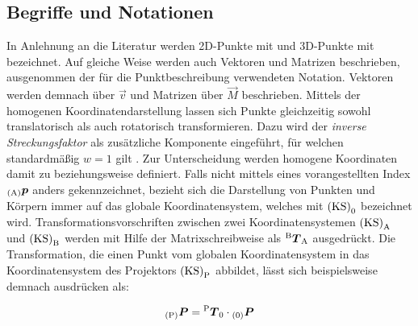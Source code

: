 \subsection{Begriffe und Notationen}
In Anlehnung an die Literatur \cite{Zhang2000} werden 2D-Punkte mit  und 3D-Punkte mit  bezeichnet. Auf gleiche Weise werden auch Vektoren und Matrizen beschrieben, ausgenommen der für die Punktbeschreibung verwendeten Notation. Vektoren werden demnach über $\vec{v}$ und Matrizen über $\vec{M}$ beschrieben. Mittels der homogenen Koordinatendarstellung lassen sich Punkte gleichzeitig sowohl translatorisch als auch rotatorisch transformieren. Dazu wird der \textit{inverse Streckungsfaktor} als zusätzliche Komponente eingeführt, für welchen standardmäßig $w=1$ gilt \cite{Nischwitz20111}. Zur Unterscheidung werden homogene Koordinaten damit zu  beziehungsweise  definiert. Falls nicht mittels eines vorangestellten Index ${_{{\mathrm{(A)}}}}\mbox{\boldmath{$p$}}$ anders gekennzeichnet, bezieht sich die Darstellung von Punkten und Körpern immer auf das globale Koordinatensystem, welches mit ${\mathrm{(KS)}}_{\mathrm{0}}$ bezeichnet wird. Transformationsvorschriften zwischen zwei Koordinatensystemen ${\mathrm{(KS)}}_{\mathrm{A}}$ und ${\mathrm{(KS)}}_{\mathrm{B}}$ werden mit Hilfe der Matrixschreibweise als ${^{\mathrm{B}}\mbox{\boldmath{$T$}}_{\mathrm{A}}}$ ausgedrückt. Die Transformation, die einen Punkt vom globalen Koordinatensystem in das Koordinatensystem des Projektors ${\mathrm{(KS)}}_{\mathrm{P}}$ abbildet, lässt sich beispielsweise demnach ausdrücken als:

\begin{equation}
{_{{\mathrm{(P)}}}}\mbox{\boldmath{$P$}} = {^{\mathrm{P}}\mbox{\boldmath{$T$}}_{\mathrm{0}}}\cdot{_{{\mathrm{(0)}}}}\mbox{\boldmath{$P$}}
\end{equation}




